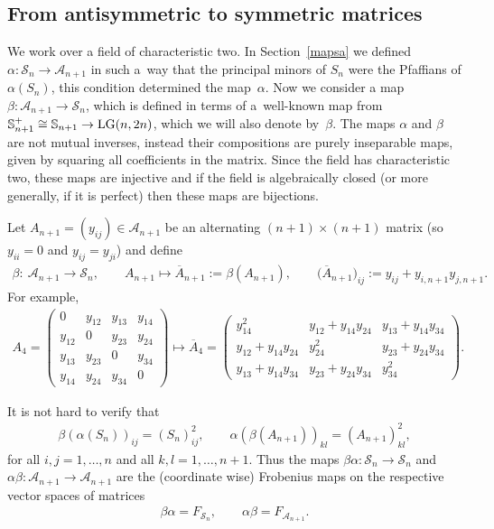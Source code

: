 \documentclass[10pt,a4paper]{amsart}
\newcommand{\bS}{{\mathbb S}}
\newcommand{\cA}{{\cal A}}
\newcommand{\cS}{{\cal S}}
\numberwithin{equation}{section}
\providecommand{\cal}{\mathcal}
\begin{document}
\subsection{From antisymmetric to symmetric matrices}\label{mapas}
  We work over a field of characteristic two. In Section~\ref{mapsa} we defined $\alpha\colon \cS_n\rightarrow\cA_{n+1}$ in such a~way that the principal minors of $S_n$ were the Pfaffians of $\alpha(S_n)$, this condition determined the map~$\alpha$. Now we consider a map $\beta\colon \cA_{n+1}\rightarrow\cS_{n}$, which is defined in terms of a~well-known map from $\bS_{n+1}^+\cong\bS_{n+1}\rightarrow {\rm LG}(n,2n)$, which we will also denote by~$\beta$. The maps $\alpha$ and $\beta$ are not mutual inverses, instead their compositions are purely inseparable maps, given by squaring all coefficients in the matrix. Since the field has characteristic two, these maps are injective and if the field is algebraically closed (or more generally, if it is perfect) then these maps are bijections.

Let $A_{n+1}=(y_{ij})\in\cA_{n+1}$ be an alternating $(n+1)\times(n+1)$ matrix (so $y_{ii}=0$ and $y_{ij}=y_{ji}$) and define
\begin{gather*}
\beta\colon \ \cA_{n+1} \longrightarrow \cS_n,\qquad A_{n+1}\longmapsto \overline{A}_{n+1}:=\beta(A_{n+1}),\qquad
\big(\overline{A}_{n+1}\big)_{ij} := y_{ij} + y_{i,n+1}y_{j,n+1}.
\end{gather*}
For example,
\begin{gather*}
A_{4} = \begin{pmatrix}
 0&y_{12}&y_{13}&y_{14}\\
 y_{12}&0&y_{23}&y_{24}\\
 y_{13}&y_{23}&0&y_{34}\\
 y_{14}&y_{24}&y_{34}&0
 \end{pmatrix}
 \longmapsto
\overline{A}_4 =
\begin{pmatrix}
y_{14}^2&y_{12}+y_{14}y_{24}&y_{13}+y_{14}y_{34}\\
y_{12}+y_{14}y_{24}&y_{24}^2&y_{23}+y_{24}y_{34}\\
y_{13}+y_{14}y_{34}&y_{23}+y_{24}y_{34}&y_{34}^2
\end{pmatrix}.
\end{gather*}


It is not hard to verify that
\begin{gather*}
\beta(\alpha(S_n))_{ij} = (S_n)_{ij}^2,\qquad
\alpha(\beta(A_{n+1}))_{kl} = (A_{n+1})_{kl}^2,
\end{gather*}
for all $i,j=1, \ldots,n$ and all $k,l=1,\ldots,n+1$. Thus the maps $\beta\alpha\colon\allowbreak \cS_n\rightarrow \cS_n$ and $\alpha\beta\colon \cA_{n+1}\rightarrow \cA_{n+1}$ are the (coordinate wise) Frobenius maps on the respective vector spaces of matrices
\begin{gather*}
\beta\alpha = F_{\cS_n},\qquad \alpha\beta = F_{\cA_{n+1}}.
\end{gather*}
\end{document}
